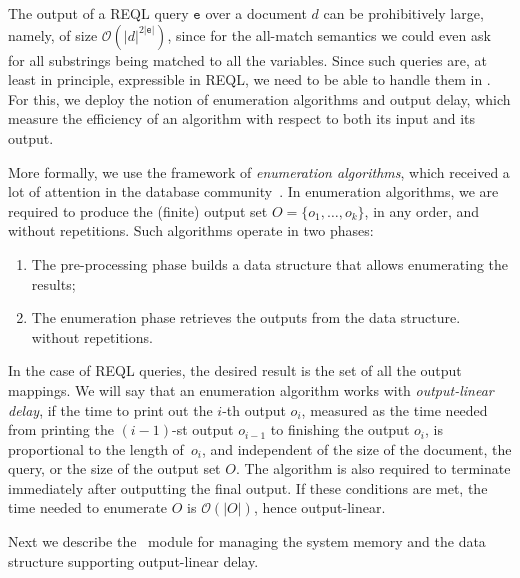 
The output of a REQL query $\texttt{e}$ over a document $d$ can be prohibitively
large, namely, of size $\mathcal{O}(|d|^{2|\texttt{e}|})$, since for the
all-match semantics we could even ask for all substrings being matched to all
the variables. Since such queries are, at least in principle, expressible in
REQL, we need to be able to handle them in \rematch. For this, we deploy the
notion of enumeration algorithms and output delay, which measure the efficiency
of an algorithm  %
with respect to both its input and its output.

More formally, we use the framework of \emph{enumeration algorithms}, which
received a lot of attention in the database
community~\citep{AmarilliBMN-tods21,FlorenzanoRUVV20,LosemannM-lics14,SchweikardtSV-jacm22,BerkholzGS-siglog20,Segoufin13,IdrisUVVL-vldbj20,IdrisUV-sigmod17,TziavelisAGRY-pvldb20}.
In enumeration algorithms, we are required to produce the (finite) output set $O
= \{o_1,\ldots ,o_k\}$, in any order, and without repetitions. Such algorithms
operate in two phases:
\begin{enumerate}
	\item The pre-processing phase builds a data structure that allows
	enumerating the results;
	\item The enumeration phase retrieves the outputs from the data structure.%
	without repetitions.
\end{enumerate}
In the case of REQL queries, the desired result is the set of all the output
mappings. We will say that an enumeration algorithm works with
\emph{output-linear delay}, if the time to print out the $i$-th output $o_i$,
measured as the time needed from printing the $(i-1)$-st output $o_{i-1}$ to
finishing the output $o_i$, is proportional to the length of~$o_i$, and
independent of the size of the document, the query, or the size of the output
set $O$. The algorithm is also required to terminate immediately after
outputting the final output. If these conditions are met, the time needed to
enumerate $O$ is $\mathcal{O}(|O|)$, hence output-linear. 

Next we describe the \rematch\ module for managing the system memory and the
data structure supporting output-linear delay.

